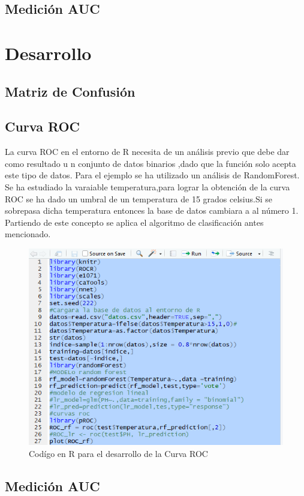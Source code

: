 \documentclass[10pt,a4paper]{article}
\begin{document}
\subsection{Medición AUC}
\section{Desarrollo}
\subsection{Matriz de Confusión}
\subsection{Curva ROC}
La curva ROC en el entorno de R necesita de un análisis previo que debe dar como resultado u n conjunto de datos binarios ,dado que la función solo acepta este tipo de datos. Para el ejemplo se ha utilizado un análisis de RandomForest.
Se ha estudiado la varaiable temperatura,para lograr la obtención de la curva ROC se ha dado un umbral de un temperatura de 15 grados celsius.Si se sobrepasa dicha temperatura entonces la base de datos cambiara a al número 1.
Partiendo de este concepto se aplica el algoritmo de clasificación antes mencionado.
\begin{figure}[H]
\centering
\includegraphics[scale=0.75]{ROC.png}
\caption{Codígo en R para el desarrollo de la Curva ROC}
\label{esquematic}
\end{figure}
\subsection{Medición AUC}
\end{document}
